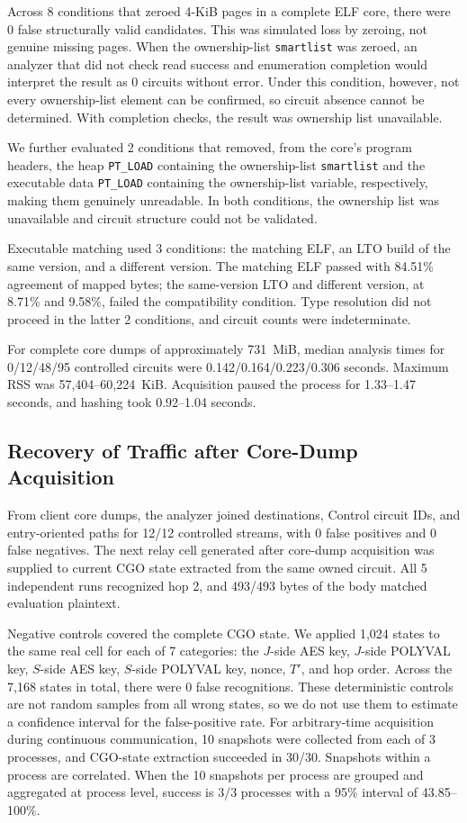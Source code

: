 \documentclass[10pt,a4paper]{article}
\newcommand{\code}[1]{\nolinkurl{#1}}
\begin{document}
Across 8 conditions that zeroed 4-KiB pages in a complete ELF core, there were 0 false structurally valid candidates. This was simulated loss by zeroing, not genuine missing pages. When the ownership-list \code{smartlist} was zeroed, an analyzer that did not check read success and enumeration completion would interpret the result as 0 circuits without error. Under this condition, however, not every ownership-list element can be confirmed, so circuit absence cannot be determined. With completion checks, the result was ownership list unavailable.

We further evaluated 2 conditions that removed, from the core's program headers, the heap \code{PT_LOAD} containing the ownership-list \code{smartlist} and the executable data \code{PT_LOAD} containing the ownership-list variable, respectively, making them genuinely unreadable. In both conditions, the ownership list was unavailable and circuit structure could not be validated.

Executable matching used 3 conditions: the matching ELF, an LTO build of the same version, and a different version. The matching ELF passed with 84.51\% agreement of mapped bytes; the same-version LTO and different version, at 8.71\% and 9.58\%, failed the compatibility condition. Type resolution did not proceed in the latter 2 conditions, and circuit counts were indeterminate.

For complete core dumps of approximately 731~MiB, median analysis times for 0/12/48/95 controlled circuits were 0.142/0.164/0.223/0.306 seconds. Maximum RSS was 57,404--60,224~KiB. Acquisition paused the process for 1.33--1.47 seconds, and hashing took 0.92--1.04 seconds.

\subsection{Recovery of Traffic after Core-Dump Acquisition}

From client core dumps, the analyzer joined destinations, Control circuit IDs, and entry-oriented paths for 12/12 controlled streams, with 0 false positives and 0 false negatives.
The next relay cell generated after core-dump acquisition was supplied to current CGO state extracted from the same owned circuit. All 5 independent runs recognized hop 2, and 493/493 bytes of the body matched evaluation plaintext.

Negative controls covered the complete CGO state. We applied 1,024 states to the same real cell for each of 7 categories: the $J$-side AES key, $J$-side POLYVAL key, $S$-side AES key, $S$-side POLYVAL key, nonce, $T'$, and hop order. Across the 7,168 states in total, there were 0 false recognitions. These deterministic controls are not random samples from all wrong states, so we do not use them to estimate a confidence interval for the false-positive rate.
For arbitrary-time acquisition during continuous communication, 10 snapshots were collected from each of 3 processes, and CGO-state extraction succeeded in 30/30. Snapshots within a process are correlated. When the 10 snapshots per process are grouped and aggregated at process level, success is 3/3 processes with a 95\% interval of 43.85--100\%.
\end{document}
